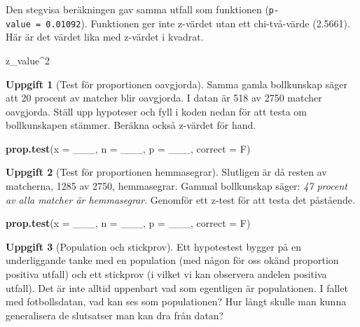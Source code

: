\documentclass[
]{book}
\newenvironment{Shaded}{\begin{snugshade}}{\end{snugshade}}
\newcommand{\AttributeTok}[1]{\textcolor[rgb]{0.13,0.29,0.53}{#1}}
\newcommand{\DecValTok}[1]{\textcolor[rgb]{0.00,0.00,0.81}{#1}}
\newcommand{\FunctionTok}[1]{\textcolor[rgb]{0.13,0.29,0.53}{\textbf{#1}}}
\newcommand{\NormalTok}[1]{#1}
\newcommand{\SpecialCharTok}[1]{\textcolor[rgb]{0.81,0.36,0.00}{\textbf{#1}}}
\theoremstyle{definition}
\theoremstyle{definition}
\theoremstyle{definition}
\newtheorem{exercise}{Uppgift}[chapter]
\theoremstyle{definition}
\theoremstyle{remark}
\begin{document}
Den stegvisa beräkningen gav samma utfall som funktionen (\texttt{p-value\ =\ 0.01092}). Funktionen ger inte z-värdet utan ett chi-två-värde (2.5661). Här är det värdet lika med z-värdet i kvadrat.

\begin{Shaded}
\begin{Highlighting}[]
\NormalTok{z\_value}\SpecialCharTok{\^{}}\DecValTok{2}
\end{Highlighting}
\end{Shaded}

\begin{exercise}[Test för proportionen oavgjorda]

Samma gamla bollkunskap säger att 20 procent av matcher blir oavgjorda. I datan är 518 av 2750 matcher oavgjorda. Ställ upp hypoteser och fyll i koden nedan för att testa om bollkunskapen stämmer. Beräkna också z-värdet för hand.

\begin{Shaded}
\begin{Highlighting}[]
\FunctionTok{prop.test}\NormalTok{(}\AttributeTok{x =}\NormalTok{ \_\_\_, }\AttributeTok{n =}\NormalTok{ \_\_\_, }\AttributeTok{p =}\NormalTok{ \_\_\_, }\AttributeTok{correct =}\NormalTok{ F)}
\end{Highlighting}
\end{Shaded}

\end{exercise}

\begin{exercise}[Test för proportionen hemmasegrar]

Slutligen är då resten av matcherna, 1285 av 2750, hemmasegrar. Gammal bollkunskap säger: \emph{47 procent av alla matcher är hemmasegrar}. Genomför ett z-test för att testa det påstående.

\begin{Shaded}
\begin{Highlighting}[]
\FunctionTok{prop.test}\NormalTok{(}\AttributeTok{x =}\NormalTok{ \_\_\_, }\AttributeTok{n =}\NormalTok{ \_\_\_, }\AttributeTok{p =}\NormalTok{ \_\_\_, }\AttributeTok{correct =}\NormalTok{ F)}
\end{Highlighting}
\end{Shaded}

\end{exercise}

\begin{exercise}[Population och stickprov]
Ett hypotestest bygger på en underliggande tanke med en population (med någon för oss okänd proportion positiva utfall) och ett stickprov (i vilket vi kan observera andelen positiva utfall). Det är inte alltid uppenbart vad som egentligen är populationen. I fallet med fotbollsdatan, vad kan ses som populationen? Hur långt skulle man kunna generalisera de slutsatser man kan dra från datan?
\end{exercise}
\end{document}
